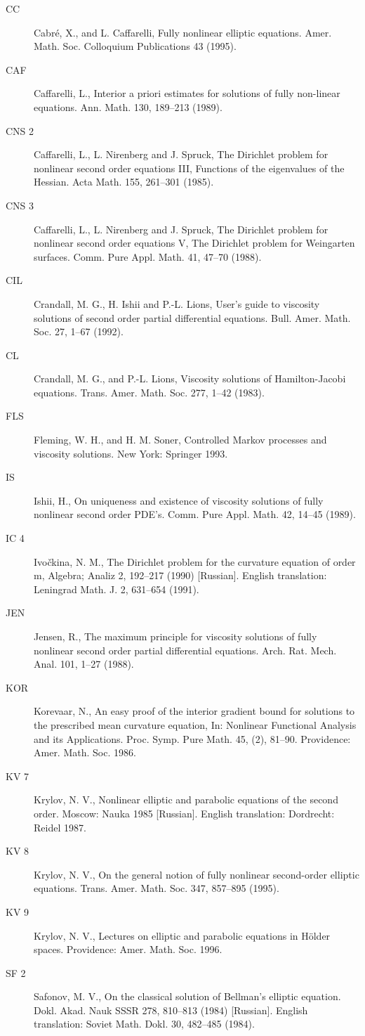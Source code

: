 \begin{description}
\item[CC] Cabré, X., and L. Caffarelli, Fully nonlinear elliptic equations. Amer. Math. Soc. Colloquium Publications 43 (1995).
\item[CAF] Caffarelli, L., Interior a priori estimates for solutions of fully non-linear equations. Ann. Math. 130, 189--213 (1989).
\item[CNS 2] Caffarelli, L., L. Nirenberg and J. Spruck, The Dirichlet problem for nonlinear second order equations III, Functions of the eigenvalues of the Hessian. Acta Math. 155, 261--301 (1985).
\item[CNS 3] Caffarelli, L., L. Nirenberg and J. Spruck, The Dirichlet problem for nonlinear second order equations V, The Dirichlet problem for Weingarten surfaces. Comm. Pure Appl. Math. 41, 47--70 (1988).
\item[CIL] Crandall, M. G., H. Ishii and P.-L. Lions, User's guide to viscosity solutions of second order partial differential equations. Bull. Amer. Math. Soc. 27, 1--67 (1992).
\item[CL] Crandall, M. G., and P.-L. Lions, Viscosity solutions of Hamilton-Jacobi equations. Trans. Amer. Math. Soc. 277, 1--42 (1983).
\item[FLS] Fleming, W. H., and H. M. Soner, Controlled Markov processes and viscosity solutions. New York: Springer 1993.
\item[IS] Ishii, H., On uniqueness and existence of viscosity solutions of fully nonlinear second order PDE's. Comm. Pure Appl. Math. 42, 14--45 (1989).
\item[IC 4] Ivo\v{c}kina, N. M., The Dirichlet problem for the curvature equation of order m, Algebra; Analiz 2, 192--217 (1990) [Russian]. English translation: Leningrad Math. J. 2, 631--654 (1991).
\item[JEN] Jensen, R., The maximum principle for viscosity solutions of fully nonlinear second order partial differential equations. Arch. Rat. Mech. Anal. 101, 1--27 (1988).
\item[KOR] Korevaar, N., An easy proof of the interior gradient bound for solutions to the prescribed mean curvature equation, In: Nonlinear Functional Analysis and its Applications. Proc. Symp. Pure Math. 45, (2), 81--90. Providence: Amer. Math. Soc. 1986.
\item[KV 7] Krylov, N. V., Nonlinear elliptic and parabolic equations of the second order. Moscow: Nauka 1985 [Russian]. English translation: Dordrecht: Reidel 1987.
\item[KV 8] Krylov, N. V., On the general notion of fully nonlinear second-order elliptic equations. Trans. Amer. Math. Soc. 347, 857--895 (1995).
\item[KV 9] Krylov, N. V., Lectures on elliptic and parabolic equations in H\"older spaces. Providence: Amer. Math. Soc. 1996.
\item[SF 2] Safonov, M. V., On the classical solution of Bellman's elliptic equation. Dokl. Akad. Nauk SSSR 278, 810--813 (1984) [Russian]. English translation: Soviet Math. Dokl. 30, 482--485 (1984).
\end{description}


